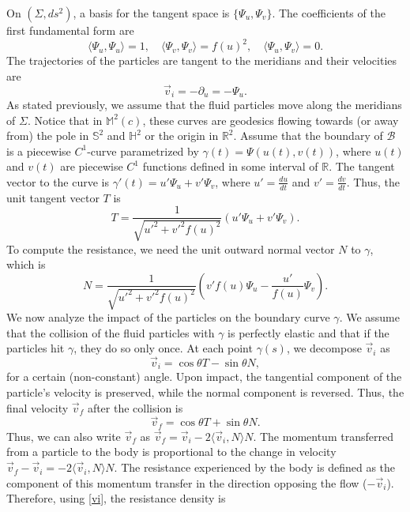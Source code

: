 \documentclass[a4paper,12pt]{amsart}
\theoremstyle{definition}
\def\r{\mathbb R}
\def\h{\mathbb H}
\def\m{\mathbb M}
\def\s{\mathbb S}
\begin{document}
 On $(\Sigma,ds^2)$, a basis for the tangent space is $\{\Psi_u, \Psi_v\}$. The coefficients of the first fundamental form are \begin{equation*}
\langle \Psi_u, \Psi_u \rangle = 1, \quad \langle \Psi_v, \Psi_v \rangle = f(u)^2, \quad \langle \Psi_u, \Psi_v \rangle = 0.
\end{equation*}
The trajectories of the particles are tangent to the meridians and their velocities are
\begin{equation*}
\vec{v}_i =-\partial_u= -\Psi_u.
\end{equation*}
 As stated previously, we assume that the fluid particles move along the meridians of $\Sigma$.   Notice that in $\m^2(c)$, these curves are geodesics flowing towards (or away from) the pole in $\s^2$ and $\h^2$ or the origin in $\r^2$. Assume that the boundary of $\mathcal{B}$ is a piecewise $C^1$-curve parametrized by $\gamma(t) = \Psi(u(t), v(t))$, where $u(t)$ and $v(t)$ are piecewise $C^1$ functions defined in some interval of $\r$. The tangent vector to the curve is $ \gamma'(t) = u' \Psi_u +v' \Psi_v$, where $u' = \frac{du}{dt}$ and $v' = \frac{dv}{dt}$. Thus, the unit tangent vector $T$ is
\begin{equation*}
T = \frac{1}{\sqrt{u'^2 +v'^2 f(u)^2}} (u' \Psi_u +v' \Psi_v).
\end{equation*}
To compute the resistance, we need the unit outward normal vector $N$ to $\gamma$, which is
\begin{equation*}
N = \frac{1}{\sqrt{u'^2 +v'^2 f(u)^2}} \left(v' f(u) \Psi_u - \frac{u'}{f(u)} \Psi_v \right).
\end{equation*}
We now analyze the impact of the particles on the boundary curve $\gamma$.  We assume that the collision of the fluid particles with  $\gamma$ is perfectly elastic and that if the particles hit   $\gamma$, they do so only once. At each point $\gamma(s)$, we decompose $\vec{v}_i$ as 
\begin{equation}\label{vi}
\vec{v}_i = \cos\theta T-\sin\theta N,
\end{equation}
for a certain (non-constant) angle. Upon impact, the tangential component of the particle's velocity is preserved, while the normal component is reversed. Thus, the final velocity $\vec{v}_f$ after the collision is 
 $$\vec{v}_f = \cos\theta T+\sin\theta N.$$
 Thus, we can also write $\vec{v}_f$ as $\vec{v}_f = \vec{v}_i - 2\langle \vec{v}_i, N \rangle N$.  The momentum transferred from a particle to the body is proportional to the change in velocity $\vec{v}_f - \vec{v}_i = -2\langle \vec{v}_i, N \rangle N$. The resistance experienced by the body is defined as the component of this momentum transfer in the direction opposing the flow ($-\vec{v}_i$). Therefore,   using \eqref{vi}, the resistance density   is  
\end{document}
